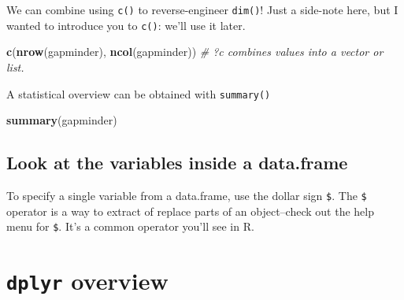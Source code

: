 \documentclass[]{book}
\newenvironment{Shaded}{\begin{snugshade}}{\end{snugshade}}
\newcommand{\KeywordTok}[1]{\textcolor[rgb]{0.13,0.29,0.53}{\textbf{{#1}}}}
\newcommand{\CommentTok}[1]{\textcolor[rgb]{0.56,0.35,0.01}{\textit{{#1}}}}
\newcommand{\NormalTok}[1]{{#1}}
\theoremstyle{definition}
\theoremstyle{definition}
\theoremstyle{definition}
\theoremstyle{remark}
\begin{document}
We can combine using \texttt{c()} to reverse-engineer \texttt{dim()}!
Just a side-note here, but I wanted to introduce you to \texttt{c()}:
we'll use it later.

\begin{Shaded}
\begin{Highlighting}[]
\KeywordTok{c}\NormalTok{(}\KeywordTok{nrow}\NormalTok{(gapminder), }\KeywordTok{ncol}\NormalTok{(gapminder)) }\CommentTok{# ?c combines values into a vector or list. }
\end{Highlighting}
\end{Shaded}

A statistical overview can be obtained with \texttt{summary()}

\begin{Shaded}
\begin{Highlighting}[]
\KeywordTok{summary}\NormalTok{(gapminder)}
\end{Highlighting}
\end{Shaded}

\subsection{Look at the variables inside a
data.frame}\label{look-at-the-variables-inside-a-data.frame}

To specify a single variable from a data.frame, use the dollar sign
\texttt{\$}. The \texttt{\$} operator is a way to extract of replace
parts of an object--check out the help menu for \texttt{\$}. It's a
common operator you'll see in R.

\begin{Shaded}
\end{Shaded}

\section{\texorpdfstring{\texttt{dplyr}
overview}{dplyr overview}}\label{dplyr-overview}
\end{document}
